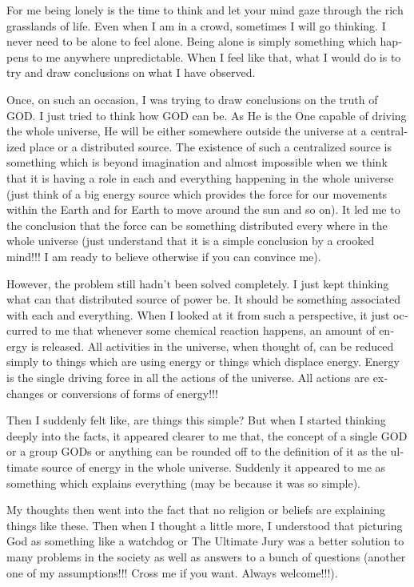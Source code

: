 \vskip 2pt
\begin{english}
For me being lonely is the time to think and let your mind gaze through the rich grasslands of life. Even when I am in a crowd, sometimes I will go thinking. I never need to be alone to feel alone. Being alone is simply something which happens to me anywhere unpredictable. When I feel like that, what I would do is to try and draw conclusions on what I have observed.

Once, on such an occasion, I was trying to draw conclusions on the truth of GOD. I just tried to think how GOD can be. As He is the One capable of driving the whole universe, He will be either somewhere outside the universe at a centralized place or a distributed source. The existence of such a centralized source is something which is beyond imagination and almost impossible when we think that it is having a role in each and everything happening in the whole universe (just think of a big energy source which provides the force for our movements within the Earth and for Earth to move around the sun and so on). It led me to the conclusion that the force can be something distributed every where in the whole universe (just understand that it is a simple conclusion by a crooked mind!!! I am ready to believe otherwise if you can convince me).

However, the problem still hadn't been solved completely. I just kept thinking what can that distributed source of power be. It should be something associated with each and everything. When I looked at it from such a perspective, it just occurred to me that whenever some chemical reaction happens, an amount of energy is released. All activities in the universe, when thought of, can be reduced simply to things which are using energy or things which displace energy. Energy is the single driving force in all the actions of the universe. All actions are exchanges or conversions of forms of energy!!!

Then I suddenly felt like, are things this simple? But when I started thinking deeply into the facts, it appeared clearer to me that, the concept of a single GOD or a group GODs or anything can be rounded off to the definition of it as the ultimate source of energy in the whole universe. Suddenly it appeared to me as something which explains everything (may be because it was so simple).

My thoughts then went into the fact that no religion or beliefs are explaining things like these. Then when I thought a little more, I understood that picturing God as something like a watchdog or The Ultimate Jury was a better solution to many problems in the society as well as answers to a bunch of questions (another one of my assumptions!!! Cross me if you want. Always welcome!!!).


\end{english}

